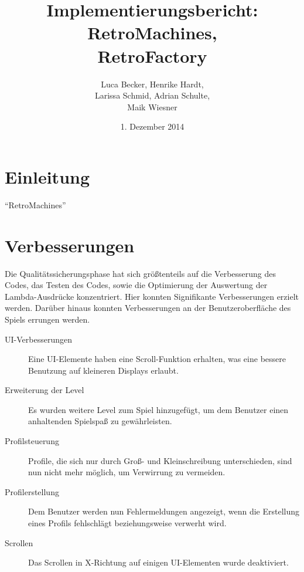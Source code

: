 \documentclass[parskip=full]{scrreprt}
\begin{document}
\title{Implementierungsbericht: RetroMachines, \\ RetroFactory}
\author{Luca Becker, Henrike Hardt,\\Larissa Schmid, Adrian Schulte,\\Maik Wiesner}
\date{1. Dezember 2014}
\maketitle
\thispagestyle{empty}

\clearpage

\thispagestyle{empty}
\tableofcontents
\thispagestyle{empty}

\clearpage
\setcounter{page}{1}

\chapter{Einleitung}

\enquote{RetroMachines}

\chapter{Verbesserungen}

Die Qualitätssicherungsphase hat sich größtenteils auf die Verbesserung des Codes, das Testen des Codes, sowie die Optimierung der Auswertung der Lambda-Ausdrücke konzentriert. Hier konnten Signifikante Verbesserungen erzielt werden. Darüber hinaus konnten Verbesserungen an der Benutzeroberfläche des Spiels errungen werden.

\begin{description}
	\item[UI-Verbesserungen] Eine UI-Elemente haben eine Scroll-Funktion erhalten, was eine bessere Benutzung auf kleineren Displays erlaubt.
	\item[Erweiterung der Level] Es wurden weitere Level zum Spiel hinzugefügt, um dem Benutzer einen anhaltenden Spielspaß zu gewährleisten.
	\item[Profilsteuerung] Profile, die sich nur durch Groß- und Kleinschreibung unterschieden, sind nun nicht mehr möglich, um Verwirrung zu vermeiden.
	\item[Profilerstellung] Dem Benutzer werden nun Fehlermeldungen angezeigt, wenn die Erstellung eines Profils fehlschlägt beziehungsweise verwerht wird.
	\item[Scrollen] Das Scrollen in X-Richtung auf einigen UI-Elementen wurde deaktiviert.
\end{description}
\end{document}
